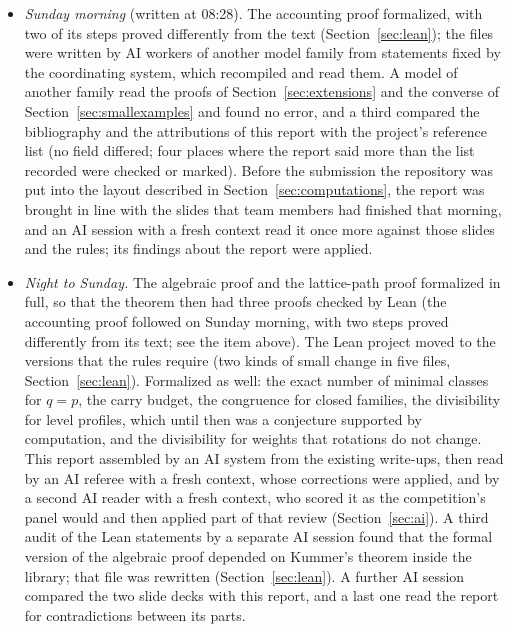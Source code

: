 \documentclass[11pt]{article}
\theoremstyle{definition}
\theoremstyle{remark}
\numberwithin{equation}{section}
\numberwithin{figure}{section}
\begin{document}
\begin{itemize}[itemsep=1pt]
 and had read the accounting proof.
\item \emph{Sunday morning} (written at 08:28). The accounting proof formalized, with two of its steps
 proved differently from the text (Section~\ref{sec:lean}); the files were written by AI workers of another
 model family from statements fixed by the coordinating system, which recompiled and read them. A model of
 another family read the proofs of Section~\ref{sec:extensions} and the converse of
 Section~\ref{sec:smallexamples} and found no error, and a third compared the bibliography and the
 attributions of this report with the project's reference list (no field differed; four places where the
 report said more than the list recorded were checked or marked). Before the submission the repository was
 put into the layout described in Section~\ref{sec:computations}, the report was brought in line with the
 slides that team members had finished that morning, and an AI session with a fresh context read it once more
 against those slides and the rules; its findings about the report were applied.
\item \emph{Night to Sunday.} The algebraic proof and the lattice-path proof formalized in full, so that the
 theorem then had three proofs checked by Lean (the accounting proof followed on Sunday morning, with two steps
 proved differently from its text; see the item above). The Lean project moved to the versions that the rules require
 (two kinds of small change in five files, Section~\ref{sec:lean}). Formalized as well: the exact number of minimal classes for $q=p$, the carry budget,
 the congruence for closed families, the divisibility for level profiles, which until then was a
 conjecture supported by computation, and the divisibility for weights that rotations do not change. This
 report assembled by an AI system from the existing write-ups, then read by an AI referee with a fresh
 context, whose corrections were applied, and by a second AI reader with a fresh context, who scored it as the
 competition's panel would and then applied part of that review (Section~\ref{sec:ai}). A third audit of the
 Lean statements by a separate AI session found that the formal version of the algebraic proof depended on
 Kummer's theorem inside the library; that file was rewritten (Section~\ref{sec:lean}). A further AI session
 compared the two slide decks with this report, and a last one read the report for contradictions between
 its parts.
\end{itemize}
\end{document}
